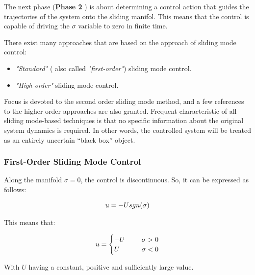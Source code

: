 \documentclass{thesisreport}
\begin{document}
\noindent The next phase (\textbf{Phase 2 }) is about determining a control action that guides the trajectories of the system onto the sliding manifol. This means that the control is capable of driving the $\sigma$ variable to zero in finite time.


\noindent There exist many approaches that are based on the approach of sliding mode control:

\begin{itemize}
	\item \textit{"Standard"} ( also called \textit{"first-order"}) sliding mode control.
	\item \textit{"High-order"} sliding mode control.
\end{itemize}


Focus is devoted to the second order sliding mode method, and a few references to the higher order approaches
are also granted. Frequent characteristic of all sliding mode-based techniques is that no specific information about the
original system dynamics is required. In other words, the controlled system will be treated as an entirely uncertain “black box” object.



\subsubsection{First-Order Sliding Mode Control}


Along the manifold $\sigma=0$, the control is discontinuous. So, it can be expressed as follows:

\begin{equation}
	u = -U \space sgn(\sigma)
\end{equation}


This means that:

\begin{equation}
\begin{aligned}
	u = \begin{cases}
		-U \hspace{0.5cm} &\sigma>0 \\
		U \hspace{0.5cm}  &\sigma<0
	\end{cases}
\end{aligned}
\end{equation}

With $U$ having a constant, positive and sufficiently large value.
\end{document}
